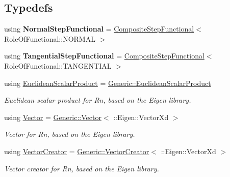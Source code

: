 \subsection*{Typedefs}
\begin{DoxyCompactItemize}
\item 
\hypertarget{namespaceSpacy_1_1Rn_a8760cfae27d8b8db4387257a3af05592}{using {\bfseries Normal\-Step\-Functional} = \hyperlink{classSpacy_1_1Rn_1_1CompositeStepFunctional}{Composite\-Step\-Functional}$<$ Role\-Of\-Functional\-::\-N\-O\-R\-M\-A\-L $>$}\label{namespaceSpacy_1_1Rn_a8760cfae27d8b8db4387257a3af05592}

\item 
\hypertarget{namespaceSpacy_1_1Rn_ad3e3006dbb798bd9f8b8b457b182e8a1}{using {\bfseries Tangential\-Step\-Functional} = \hyperlink{classSpacy_1_1Rn_1_1CompositeStepFunctional}{Composite\-Step\-Functional}$<$ Role\-Of\-Functional\-::\-T\-A\-N\-G\-E\-N\-T\-I\-A\-L $>$}\label{namespaceSpacy_1_1Rn_ad3e3006dbb798bd9f8b8b457b182e8a1}

\item 
\hypertarget{group__EigenGroup_gaf2be4f79056513f7e3e35f7afdc794ee}{using \hyperlink{group__EigenGroup_gaf2be4f79056513f7e3e35f7afdc794ee}{Euclidean\-Scalar\-Product} = \hyperlink{classSpacy_1_1Generic_1_1EuclideanScalarProduct}{Generic\-::\-Euclidean\-Scalar\-Product}}\label{group__EigenGroup_gaf2be4f79056513f7e3e35f7afdc794ee}

\begin{DoxyCompactList}\small\item\em Euclidean scalar product for Rn, based on the Eigen library. \end{DoxyCompactList}\item 
using \hyperlink{group__VectorSpaceGroup_gafda42fd5aa3f7597a42b9831bf4dfd07}{Vector} = \hyperlink{classSpacy_1_1Generic_1_1Vector}{Generic\-::\-Vector}$<$ \-::Eigen\-::\-Vector\-Xd $>$
\begin{DoxyCompactList}\small\item\em Vector for Rn, based on the Eigen library. \end{DoxyCompactList}\item 
\hypertarget{namespaceSpacy_1_1Rn_ab3b27cb653ec69d12c809394126b046a}{using \hyperlink{namespaceSpacy_1_1Rn_ab3b27cb653ec69d12c809394126b046a}{Vector\-Creator} = \hyperlink{classSpacy_1_1Generic_1_1VectorCreator}{Generic\-::\-Vector\-Creator}$<$ \-::Eigen\-::\-Vector\-Xd $>$}\label{namespaceSpacy_1_1Rn_ab3b27cb653ec69d12c809394126b046a}

\begin{DoxyCompactList}\small\item\em Vector creator for Rn, based on the Eigen library. \end{DoxyCompactList}\end{DoxyCompactItemize}
